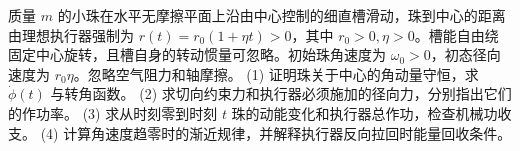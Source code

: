 质量 \(m\) 的小珠在水平无摩擦平面上沿由中心控制的细直槽滑动，珠到中心的距离由理想执行器强制为 \(r(t)=r_0(1+\eta t)>0\)，其中 \(r_0>0,\eta>0\)。槽能自由绕固定中心旋转，且槽自身的转动惯量可忽略。初始珠角速度为 \(\omega_0>0\)，初态径向速度为 \(r_0\eta\)。忽略空气阻力和轴摩擦。
(1) 证明珠关于中心的角动量守恒，求 \(\dot\phi(t)\) 与转角函数。
(2) 求切向约束力和执行器必须施加的径向力，分别指出它们的作功率。
(3) 求从时刻零到时刻 \(t\) 珠的动能变化和执行器总作功，检查机械功收支。
(4) 计算角速度趋零时的渐近规律，并解释执行器反向拉回时能量回收条件。
